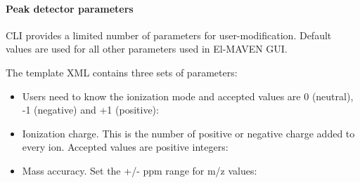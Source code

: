 \documentclass[letterpaper,10pt,english,openany,oneside]{sphinxmanual}
\begin{document}
\paragraph{Peak detector parameters}
\label{\detokenize{IntroductiontoElMAVENCLI:peak-detector-parameters}}
CLI provides a limited number of parameters for user-modification. Default values are used for all other parameters used in El-MAVEN GUI.

The template XML contains three sets of parameters:

\begin{itemize}
\item {} 
Users need to know the ionization mode and accepted values are 0 (neutral), -1 (negative) and +1 (positive): 

\item {} 
Ionization charge. This is the number of positive or negative charge added to every ion. Accepted values are positive integers: 

\item {} 
Mass accuracy. Set the +/- ppm range for m/z values: 

\end{itemize}
\end{document}
